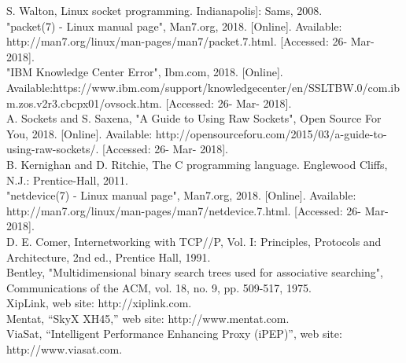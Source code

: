 \documentclass{uathesis}
\begin{document}
\noindent [35] S. Walton, Linux socket programming. Indianapolis]: Sams, 2008. \\

\noindent [36] "packet(7) - Linux manual page", Man7.org, 2018. [Online]. Available: http://man7.org/linux/man-pages/man7/packet.7.html. [Accessed: 26- Mar- 2018]. \\

\noindent [37] "IBM Knowledge Center Error", Ibm.com, 2018. [Online]. Available:https://www.ibm.com/support/knowledgecenter/en/SSLTBW.0/com.ibm.zos.v2r3.cbcpx01/ovsock.htm. [Accessed: 26- Mar- 2018].\\

\noindent [38] A. Sockets and S. Saxena, "A Guide to Using Raw Sockets", Open Source For You, 2018. [Online]. Available: http://opensourceforu.com/2015/03/a-guide-to-using-raw-sockets/. [Accessed: 26- Mar- 2018]. \\

\noindent [39] B. Kernighan and D. Ritchie, The C programming language. Englewood Cliffs, N.J.: Prentice-Hall, 2011.\\

\noindent [40] "netdevice(7) - Linux manual page", Man7.org, 2018. [Online]. Available: http://man7.org/linux/man-pages/man7/netdevice.7.html. [Accessed: 26- Mar- 2018].\\

\noindent [41] D. E. Comer, Internetworking with TCP//P, Vol. I: Principles, Protocols and Architecture, 2nd ed., Prentice Hall, 1991. \\

\noindent [42]  Bentley, "Multidimensional binary search trees used for associative searching", Communications of the ACM, vol. 18, no. 9, pp. 509-517, 1975. \\

\noindent [43A. Aho, J. Hopcroft and J. Ullman, Data Structures and algorithms. Delhi: Dorling Kindersly, 2009. \\


\noindent CURRENT


\noindent [12] XipLink, web site: http://xiplink.com. \\

\noindent [13] Mentat, “SkyX XH45,” web site: http://www.mentat.com.\\

\noindent [14] ViaSat, “Intelligent Performance Enhancing Proxy (iPEP)”, web site: http://www.viasat.com. \\
\end{document}

